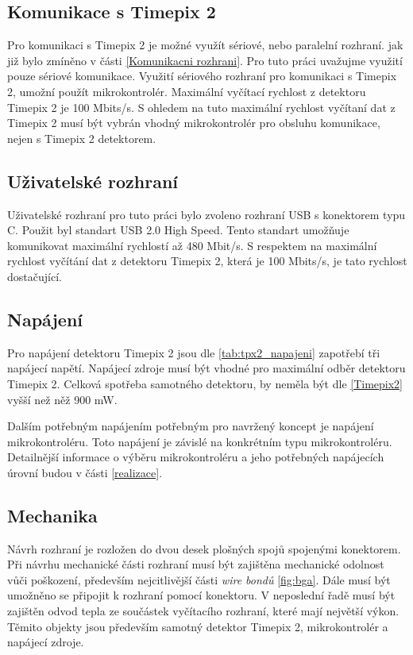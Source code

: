 \subsection{Komunikace s Timepix 2}
Pro komunikaci s Timepix 2 je možné využít sériové, nebo paralelní rozhraní. jak již bylo zmíněno v části \ref{Komunikacni rozhrani}. Pro tuto práci uvažujme využití pouze sériové komunikace. Využití sériového rozhraní pro komunikaci s Timepix 2, umožní použít mikrokontrolér. Maximální vyčítací rychlost z detektoru Timepix 2 je 100 Mbits/s. S ohledem na tuto maximální rychlost vyčítaní dat z Timepix 2 musí být vybrán vhodný mikrokontrolér pro obsluhu komunikace, nejen s Timepix 2 detektorem. 

\subsection{Uživatelské rozhraní}
Uživatelské rozhraní pro tuto práci bylo zvoleno rozhraní USB s konektorem typu C. Použit byl standart USB 2.0 High Speed. Tento standart umožňuje komunikovat maximální rychlostí až 480 Mbit/s. S respektem na maximální rychlost vyčítání dat z detektoru Timepix 2, která je 100 Mbits/s, je tato rychlost dostačující. 

\subsection{Napájení}
Pro napájení detektoru Timepix 2 jsou dle \ref{tab:tpx2_napajeni} zapotřebí tři napájecí napětí. Napájecí zdroje musí být vhodné pro maximální odběr detektoru Timepix 2. Celková spotřeba samotného detektoru, by neměla být dle \ref{Timepix2} vyšší než něž 900 mW. 
\par Dalším potřebným napájením potřebným pro navržený koncept je napájení mikrokontroléru. Toto napájení je závislé na konkrétním typu mikrokontroléru. Detailnější informace o výběru mikrokontroléru a jeho potřebných napájecích úrovní budou v části \ref{realizace}. 

\subsection{Mechanika}
Návrh rozhraní je rozložen do dvou desek plošných spojů spojenými konektorem. Při návrhu mechanické části rozhraní musí být zajištěna mechanické odolnost vůči poškození, především nejcitlivější části \textit{wire bondů} \ref{fig:bga}. Dále musí být umožněno se připojit k rozhraní pomocí konektoru. V neposlední řadě musí být zajištěn odvod tepla ze součástek vyčítacího rozhraní, které mají největší výkon. Těmito objekty jsou především samotný detektor Timepix 2, mikrokontrolér a napájecí zdroje. 
